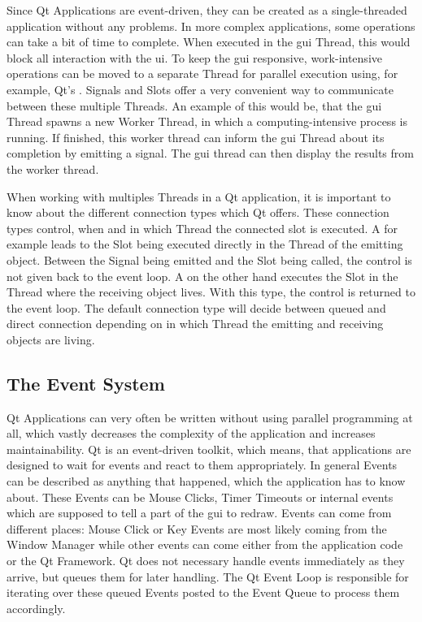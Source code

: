 Since Qt Applications are event-driven, they can be created as a single-threaded
application without any problems. In more complex applications, some operations
can take a bit of time to complete. When executed in the \gls{gui}
Thread, this would block all interaction with the \gls{ui}. To keep the \gls{gui}
responsive, work-intensive operations can be moved to a separate Thread for
parallel execution using, for example, Qt's .
Signals and Slots offer a very convenient way to communicate between these
multiple Threads. An example of this would be, that the \gls{gui} Thread spawns
a new Worker Thread, in which a computing-intensive process is running. If
finished, this worker thread can inform the \gls{gui} Thread about its
completion by emitting a signal. The \gls{gui} thread can then display the
results from the worker thread.

When working with multiples Threads in a Qt application, it is important to know
about the different connection types which Qt offers. These connection types
control, when and in which Thread the connected slot is executed. A
 for example leads to the Slot
being executed directly in the Thread of the emitting object. Between the Signal
being emitted and the Slot being called, the control is not given back to the
event loop. A  on the other hand
executes the Slot in the Thread where the receiving object lives. With this
type, the control is returned to the event loop. The default connection type
 will decide between queued and
direct connection depending on in which Thread the emitting and receiving
objects are living.
\cite{QtConnectionTypes}



\subsection{The Event System}
\label{sec:fundamentals:qt:eventloop}

Qt Applications can very often be written without using parallel programming at
all, which vastly decreases the complexity of the application and increases
maintainability. Qt is an event-driven toolkit, which means, that applications
are designed to wait for events and react to them appropriately. In general
Events can be described as anything that happened, which the application
has to know about.  These Events can be Mouse Clicks, Timer Timeouts or internal
events which are supposed to tell a part of the \gls{gui} to redraw. Events can
come from different places: Mouse Click or Key Events are most likely
coming from the Window Manager while other events can come either from the
application code or the Qt Framework.
Qt does not necessary handle events immediately as they arrive, but queues
them for later handling. The Qt Event Loop is responsible for iterating over
these queued Events posted to the Event Queue to process them accordingly.

